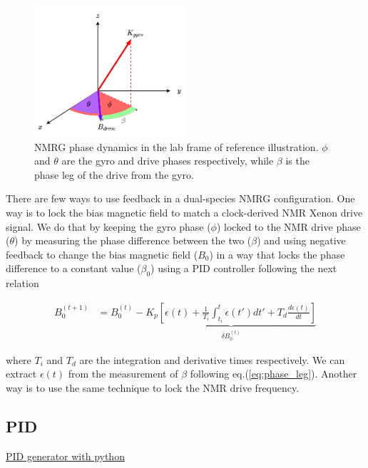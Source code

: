 \documentclass{article}
\begin{document}
\begin{figure}[h]
\centering
\includegraphics[width=0.5\textwidth]{Theory/Figures/NMRG_phase_dynamics.png}
\caption{NMRG phase dynamics in the lab frame of reference illustration. $\phi$ and $\theta$ are the gyro and drive phases respectively, while $\beta$ is the phase leg of the drive from the gyro.}
\label{fig:nmrg_phase_dynamics}
\end{figure}

There are few ways to use feedback in a dual-species NMRG configuration. One way is to lock the bias magnetic field to match a clock-derived NMR Xenon drive signal. We do that by keeping the gyro phase ($\phi$) locked to the NMR drive phase ($\theta$) by measuring the phase difference between the two ($\beta$) and using negative feedback to change the bias magnetic field ($B_0$) in a way that locks the phase difference to a constant value ($\beta_0$) using a PID controller following the next relation

\begin{align}
     B_{0}^{\left(t+1\right)} &= B_{0}^{\left(t\right)} - \underset{\delta B_{0}^{\left(t\right)}}{\underbrace{K_p \left[ \epsilon\left(t\right) + \frac{1}{T_i} \int_{t_i}^{t} \epsilon\left(t'\right)dt' + T_{d} \frac{d \epsilon\left(t\right)}{dt} \right]}}
\end{align}

where $T_i$ and $T_d$ are the integration and derivative times respectively. We can extract $\epsilon\left(t\right)$ from the measurement of $\beta$ following eq.(\ref{eq:phase_leg}). Another way is to use the same technique to lock the NMR drive frequency. 

\subsection{PID}
\href{https://jckantor.github.io/CBE30338/04.03-PID_Control_with_Bumpless_Transfer.html}{PID generator with python}
\end{document}
